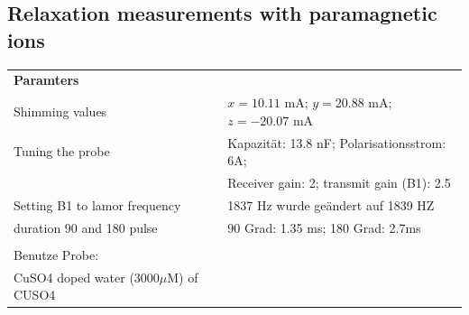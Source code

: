     \subsection{Relaxation measurements with paramagnetic ions}
\begin{tabular}{ll}

    \textbf{Paramters} &            \\
    
    Shimming values & $x = 10.11$ mA; $y = 20.88$ mA; $z = −20.07$ mA \\
    
    Tuning the probe & Kapazität: 13.8 nF; Polarisationsstrom: 6A;\\
    & Receiver gain: 2; transmit gain (B1): 2.5\\
    
    Setting B1 to lamor frequency &    1837 Hz wurde geändert auf 1839 HZ\\
    
    duration 90 and 180 pulse & 90 Grad: 1.35 ms; 180 Grad: 2.7ms \\
    
               &            \\
    
    Benutze Probe: & \\
    CuSO4 doped water (3000$\mu$M) of CUSO4 &            \\
    
    \end{tabular}  

